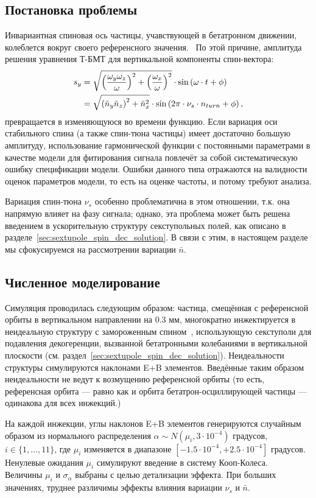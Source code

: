 
\subsection{Постановка проблемы}
Инвариантная спиновая ось частицы, учавствующей в бетатронном движении, колеблется вокруг своего референсного значения.~\cite[стр.~11]{Shatunov} По этой причине, амплитуда решения уравнения Т-БМТ для вертикальной компоненты спин-вектора:
\begin{align}
s_y &= \sqrt{\bkt{\frac{\w_y\w_z}{\w}}^2 + \bkt{\frac{\w_x}{\w}}^2}\cdot\sin\bkt{\w\cdot t + \phi}\notag\\
&= \sqrt{\bkt{\bar n_y\bar n_z}^2 + \bar n_x^2} \cdot \sin\bkt{2\pi\cdot\nu_s\cdot n_{turn} + \phi},\label{eq:sy_varying_amplitude}
\end{align}
превращается в изменяющуюся во времени функцию. Если вариация оси стабильного спина (а также спин-тюна частицы) имеет достаточно большую амплитуду, использование гармонической функции с постоянными параметрами в качестве модели для фитирования сигнала повлечёт за собой систематическую ошибку спецификации модели. Ошибки данного типа отражаются на валидности оценок параметров модели, то есть на оценке частоты, и потому требуют анализа.

Вариация спин-тюна $\nu_s$ особенно проблематична в этом отношении, т.к. она напрямую влияет на фазу сигнала; однако, эта проблема может быть решена введением в ускорительную структуру секступольных полей, как описано в разделе~\ref{sec:sextupole_spin_dec_solution}. В связи с этим, в настоящем разделе мы сфокусируемся на рассмотрении вариации $\bar n$.

\subsection{Численное моделирование}
Симуляция проводилась следующим образом: частица, смещённая с референсной орбиты в вертикальном направлении
на 0.3 мм, многократно инжектируется в неидеальную структуру с замороженным спином~\cite{Senichev:Lattices},
использующую секступоли для подавления декогеренции, вызванной бетатронными колебаниями
в вертикальной плоскости (см. раздел~\ref{sec:sextupole_spin_dec_solution}).
Неидеальности структуры симулируются наклонами E+B элементов.
Введённые таким образом неидеальности не ведут к возмущению референсной орбиты (то есть,
референсная орбита --- равно как и орбита бетатрон-осциллирующей частицы --- одинакова для всех инжекций.)

На каждой инжекции, углы наклонов E+B элементов генерируются случайным образом из
нормального распределения $\alpha\sim N(\mu_i, 3\cdot 10^{-4})$ градусов, $i\in\{1,\dots,11\}$, где
$\mu_i$ изменяется в диапазоне $[-1.5\cdot10^{-4}, +2.5\cdot10^{-4}]$ градусов. Ненулевые ожидания $\mu_i$
симулируют введение в систему Кооп-Колеса.~\cite{Koop:SpinWheel} Величины $\mu_i$ и $\sigma_{\alpha}$
выбраны с целью детализации эффекта. При больших значениях, труднее различимы эффекты влияния вариации
$\nu_s$ и $\bar n$.

